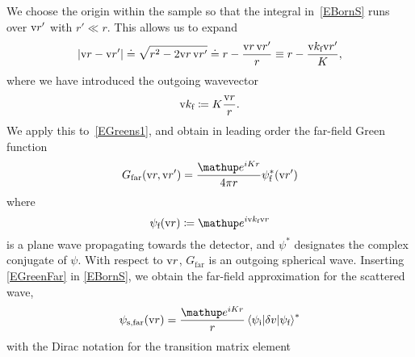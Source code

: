 We choose the origin within the sample
so that the integral in~\cref{EBornS} runs over $\text{v}{r}'$ with $r'\ll r$.
This allows us to expand
\begin{equation}
  \left|\text{v}{r}-\text{v}{r}'\right|
  \doteq \sqrt{r^2-2\text{v}{r}\,\text{v}{r}'}
  \doteq r - \frac{\text{v}{r}\,\text{v}{r}'}{r}
  \equiv r - \frac{\text{v}{k}_{\text{f}} \text{v}{r}'}{K},
\end{equation}
%
%
where we have introduced the outgoing wavevector
\begin{equation}
  \text{v}{k}_{\text{f}}\coloneqq K\frac{\text{v}{r}}{r}.
\end{equation}
We apply this to~\cref{EGreens1},
%
and obtain in leading order the far-field Green function
\begin{equation}\label{EGreenFar}
  G_\text{far}(\r,\r')
  = \frac{\e^{iKr}}{4\pi r}\psi^*_\sf(\r')
\end{equation}
%
where
\begin{equation}\label{EPsisfar}
  \psi_\sf(\r) \coloneqq  \e^{i\k_\sf \r}
\end{equation}
%
is a plane wave propagating towards the detector,
and $\psi^*$ designates the complex conjugate of $\psi$.
With respect to $\text{v}{r}$, $G_\text{far}$ is an outgoing spherical wave.
Inserting \cref{EGreenFar} in \cref{EBornS},
we obtain the far-field approximation for the scattered wave,
\begin{equation}\label{EsandwichC}
  \psi_\text{s,far}(\r)
  = \frac{\e^{iKr}}{r}
    \bra \psi_\si|\delta v|\psi_\sf\ket^*
\end{equation}
%
with the Dirac notation for the transition matrix element
%
%

